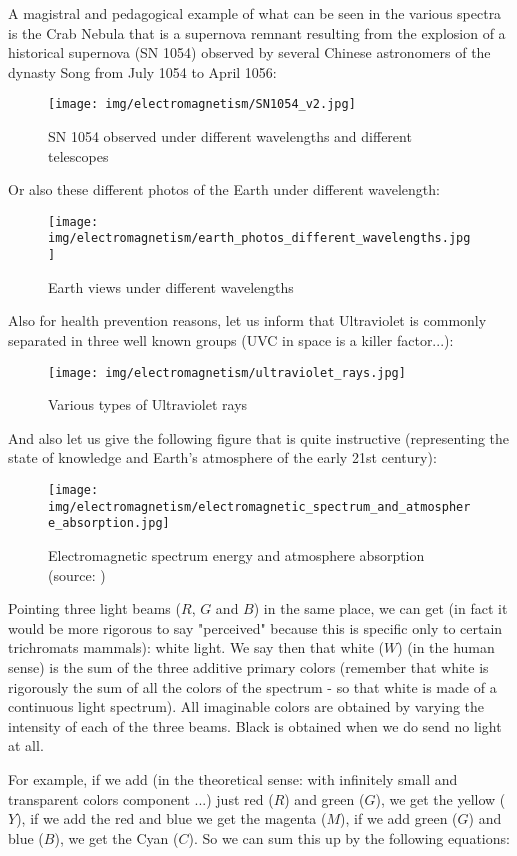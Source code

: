 	A magistral and pedagogical example of what can be seen in the various spectra is the Crab Nebula that is a supernova remnant resulting from the explosion of a historical supernova (SN 1054) observed by several Chinese astronomers of the dynasty Song from July 1054 to April 1056:
	\begin{figure}[H]
		\centering
		\texttt{[image: img/electromagnetism/SN1054\_v2.jpg]}
		\caption{SN 1054 observed under different wavelengths and different telescopes}
	\end{figure}
	Or also these different photos of the Earth under different wavelength:
	\begin{figure}[H]
		\centering
		\texttt{[image: img/electromagnetism/earth\_photos\_different\_wavelengths.jpg]}
		\caption{Earth views under different wavelengths}
	\end{figure}
	Also for health prevention reasons, let us inform that Ultraviolet is commonly separated in three well known groups (UVC in space is a killer factor...):
	\begin{figure}[H]
		\centering
		\texttt{[image: img/electromagnetism/ultraviolet\_rays.jpg]}
		\caption{Various types of Ultraviolet rays}
	\end{figure}
	And also let us give the following figure that is quite instructive (representing the state of knowledge and Earth's atmosphere of the early 21st century):
	\begin{figure}[H]
		\centering
		\texttt{[image: img/electromagnetism/electromagnetic\_spectrum\_and\_atmosphere\_absorption.jpg]}
		\caption[Electromagnetic spectrum energy and atmosphere absorption]{Electromagnetic spectrum energy and atmosphere absorption (source: \cite{fels2015fields})}
	\end{figure}
	Pointing three light beams ($R$, $G$ and $B$) in the same place, we can get (in fact it would be more rigorous to say "perceived" because this is specific only to certain trichromats mammals): white light. We say then that white ($W$) (in the human sense) is the sum of the three additive primary colors (remember that white is rigorously the sum of all the colors of the spectrum - so that white is made of a continuous light spectrum). All imaginable colors are obtained by varying the intensity of each of the three beams. Black is obtained when we do send no light at all.
	
	For example, if we add (in the theoretical sense: with infinitely small and transparent colors component ...) just red ($R$) and green ($G$), we get the yellow ($Y$), if we add the red and blue we get the magenta ($M$), if we add green ($G$) and blue ($B$), we get the Cyan ($C$). So we can sum this up by the following equations:
	
